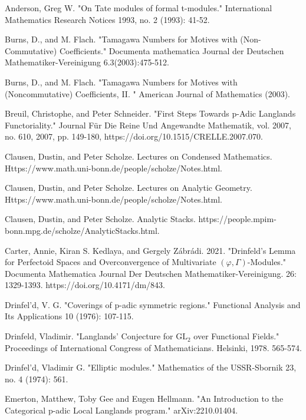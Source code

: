 \documentclass[12pt]{article}
\begin{document}
\begin{thebibliography}{}

 Anderson, Greg W. "On Tate modules of formal t-modules." International Mathematics Research Notices 1993, no. 2 (1993): 41-52.

 Burns, D., and  M. Flach. "Tamagawa Numbers for Motives with (Non-Commutative) Coefficients." Documenta mathematica Journal der Deutschen Mathematiker-Vereinigung 6.3(2003):475-512.

 Burns, D., and M. Flach. "Tamagawa Numbers for Motives with (Noncommutative) Coefficients, II. " American Journal of Mathematics (2003).

 Breuil, Christophe, and Peter Schneider. "First Steps Towards p-Adic Langlands Functoriality." Journal F\"ur Die Reine Und Angewandte Mathematik, vol. 2007, no. 610, 2007, pp. 149-180, https://doi.org/10.1515/CRELLE.2007.070.

 Clausen, Dustin, and Peter Scholze. Lectures on Condensed Mathematics. Https://www.math.uni-bonn.de/people/scholze/Notes.html.

 Clausen, Dustin, and Peter Scholze. Lectures on Analytic Geometry. Https://www.math.uni-bonn.de/people/scholze/Notes.html.

 Clausen, Dustin, and Peter Scholze. Analytic Stacks. https://people.mpim-bonn.mpg.de/scholze/AnalyticStacks.html.

 Carter, Annie, Kiran S. Kedlaya, and Gergely Z\'abr\'adi. 2021. "Drinfeld's Lemma for Perfectoid Spaces and Overconvergence of Multivariate $(\varphi, \Gamma)$-Modules." Documenta Mathematica Journal Der Deutschen Mathematiker-Vereinigung. 26: 1329-1393. https://doi.org/10.4171/dm/843.

 Drinfel'd, V. G. "Coverings of p-adic symmetric regions." Functional Analysis and Its Applications 10 (1976): 107-115.

 Drinfeld, Vladimir. "Langlands' Conjecture for $\mathrm{GL}_2$ over Functional Fields." Proceedings of International Congress of Mathematicians. Helsinki, 1978. 565-574.

 Drinfel'd, Vladimir G. "Elliptic modules." Mathematics of the USSR-Sbornik 23, no. 4 (1974): 561.

 Emerton, Matthew, Toby Gee and Eugen Hellmann. "An Introduction to the Categorical p-adic Local Langlands program." arXiv:2210.01404.


\end{thebibliography}
\end{document}
